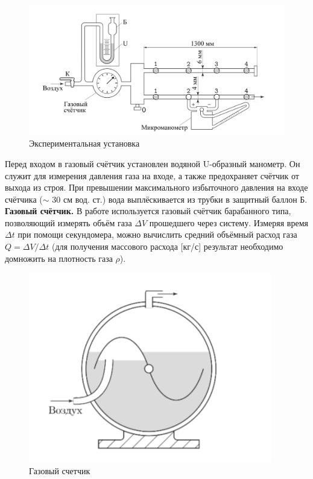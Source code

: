 \documentclass[a4paper, 12pt]{article}
\begin{document}
    \begin{figure}[H]
        \centering
        \includegraphics[scale=0.65]{images/installation.png}
        \caption{Экспериментальная установка}
        \label{installation}
    \end{figure}

    \noindent Перед входом в газовый счётчик установлен водяной U-образный манометр. Он служит для измерения давления газа на входе, а также предохраняет счётчик от выхода из строя. При превышении максимального избыточного давления на входе счётчика ($\sim$ 30 см вод. ст.) вода выплёскивается из трубки в защитный баллон Б. \\

    \noindent \textbf{Газовый счётчик.} В работе используется газовый счётчик барабанного типа, позволяющий измерять объём газа $\Delta V$ прошедшего через систему. Измеряя время $\Delta t$ при помощи секундомера, можно вычислить средний объёмный расход газа $Q = \Delta V/ \Delta t$ (для получения массового расхода [кг/с] результат необходимо домножить на плотность газа $\rho$).

    \begin{figure}[H]
        \centering
        \includegraphics[scale=0.7]{images/gascounter.png}
        \caption{Газовый счетчик}
        \label{gascounter}
    \end{figure}
\end{document}
